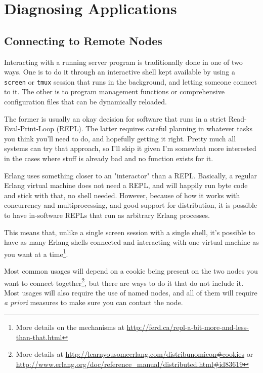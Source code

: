 \documentclass[11pt, oneside]{book}   	%
\newcommand{\app}[1]{\Verb`#1`}
\begin{document}

\part{Diagnosing Applications}
\label{part:diagnosing-applictions}


\chapter{Connecting to Remote Nodes}
\label{chap:connecting}

Interacting with a running server program is traditionally done in one of two ways. One is to do it through an interactive shell kept available by using a \app{screen} or \app{tmux} session that runs in the background, and letting someone connect to it. The other is to program management functions or comprehensive configuration files that can be dynamically reloaded.

The former is usually an okay decision for software that runs in a strict Read-Eval-Print-Loop (REPL). The latter requires careful planning in whatever tasks you think you'll need to do, and hopefully getting it right. Pretty much all systems can try that approach, so I'll skip it given I'm somewhat more interested in the cases where stuff is already bad and no function exists for it.

Erlang uses something closer to an "interactor" than a REPL. Basically, a regular Erlang virtual machine does not need a REPL, and will happily run byte code and stick with that, no shell needed. However, because of how it works with concurrency and multiprocessing, and good support for distribution, it is possible to have in-software REPLs that run as arbitrary Erlang processes.

This means that, unlike a single screen session with a single shell, it's possible to have as many Erlang shells connected and interacting with one virtual machine as you want at a time\footnote{More details on the mechanisms at \href{http://ferd.ca/repl-a-bit-more-and-less-than-that.html}{http://ferd.ca/repl-a-bit-more-and-less-than-that.html}}.

Most common usages will depend on a cookie being present on the two nodes you want to connect together\footnote{More details at \href{http://learnyousomeerlang.com/distribunomicon\#cookies}{http://learnyousomeerlang.com/distribunomicon\#cookies} or \href{http://www.erlang.org/doc/reference\_manual/distributed.html\#id83619}{http://www.erlang.org/doc/reference\_manual/distributed.html\#id83619}}, but there are ways to do it that do not include it. Most usages will also require the use of named nodes, and all of them will require \emph{a priori} measures to make sure you can contact the node.
\end{document}
